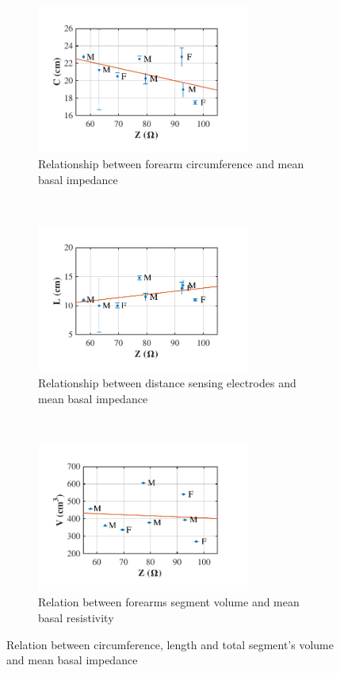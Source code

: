 \begin{figure}[!b]
	\centering
	\begin{subfigure}[t]{0.48\textwidth}
		\centering
		\includegraphics[width=7cm]{figure_b_2a}
		\caption{Relationship between forearm circumference and mean basal impedance}
		\label{fig:C_vs_Z}
	\end{subfigure}%
	~ 
	\begin{subfigure}[t]{0.48\textwidth}
		\centering
		\includegraphics[width=7cm]{figure_b_2b}
		\caption{Relationship between distance sensing electrodes and mean basal impedance}
		\label{fig:l_vs_Z}
	\end{subfigure}
	~ 
	\begin{subfigure}[t]{0.48\textwidth}
		\centering
		\includegraphics[width=7cm]{figure_b_2c}
		\caption{Relation between forearms segment volume and mean basal resistivity}
		\label{fig:Ve_vs_Z}
	\end{subfigure}
	\caption{Relation between circumference, length and total segment's volume and mean basal impedance}
	\label{fig:relation_geometry_vs_impedance}
\end{figure}

